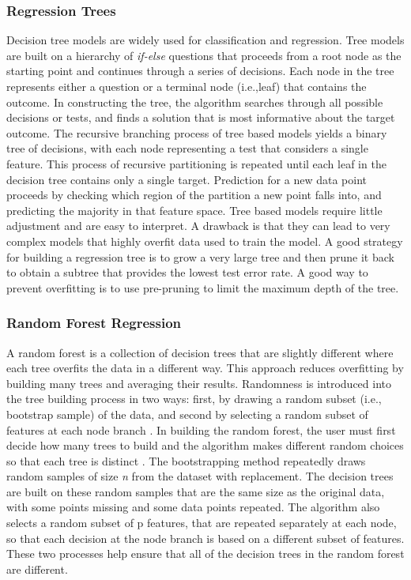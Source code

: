 \documentclass[sigconf]{acmart}
\begin{document}
\subsubsection{Regression Trees}
Decision tree models are widely used for classification and regression. Tree 
models are built on a hierarchy of \textit{if-else} questions that proceeds 
from a root node as the starting point and continues through a series of 
decisions. Each node in the tree represents either a question or a terminal 
node (i.e.,leaf) that contains the outcome. In constructing the tree, the 
algorithm searches through all possible decisions or tests, and finds a 
solution that is most informative about the target outcome. The recursive 
branching process of tree based models yields a binary tree of decisions, 
with each node representing a test that considers a single feature. This 
process of recursive partitioning is repeated until each leaf in the decision 
tree contains only a single target. Prediction for a new data point proceeds 
by checking which region of the partition a new point falls into, and 
predicting the majority in that feature space. Tree based models require 
little adjustment and are easy to interpret. A drawback is that they can lead 
to very complex models that highly overfit data used to train the model. A 
good strategy for building a regression tree is to grow a very large tree 
and then prune it back to obtain a subtree that provides the lowest test error 
rate. A good way to prevent overfitting is to use pre-pruning to limit 
the maximum depth of the tree. 

\subsubsection{Random Forest Regression}

A random forest is a collection of decision trees that are slightly different 
where each tree overfits the data in a different way. This approach reduces 
overfitting by building many trees and averaging their results. Randomness is 
introduced into the tree building process in two ways: first, by drawing a 
random subset (i.e., bootstrap sample) of the data, and second by selecting 
a random subset of features at each node branch \cite{breiman01}. In building 
the random forest, the user must first decide how many trees to build and the 
algorithm makes different random choices so that each tree is distinct
\cite{muller17, raschka17}. The bootstrapping method repeatedly draws random 
samples of size \textit{n} from the dataset with replacement. The decision 
trees are built on these random samples that are the same size as the original 
data, with some points missing and some data points repeated. The algorithm 
also selects a random subset of p features, that are repeated separately at 
each node, so that each decision at the node branch is based on a different 
subset of features. These two processes help ensure that all of the decision 
trees in the random forest are different. 
\end{document}
